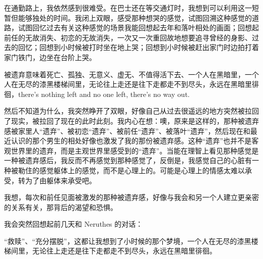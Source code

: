在通勤路上，我依然感到很难受。在巴士还在等交通灯时，我想到可以利用这一短暂但能够独处的时间。我闭上双眼，感受那种想哭的感觉，试图回溯这种感觉的道路，试图回忆过去有关这种感觉的场景\pozhehao{}我能回想起去年和落叶相处的画面；回想起前任的无故消失、初恋的无故消失，一次又一次重回故地想要追寻曾经的身影、过去的回忆；回想到小时候被打时坐在地上哭；回想到小时候被赶出家门时边拍打着家门铁门，边坐在台阶上哭。

被遗弃意味着死亡、孤独、无意义、虚无、不值得活下去、一个人在黑暗里，一个人在无尽的漆黑楼梯间里，无论往上走还是往下走都走不到尽头，永远在黑暗里徘徊，there's nothing left and no one left, there's no way out.

然后不知道为什么，我突然睁开了双眼，好像自己从过去很遥远的地方突然被拉回了现实，被拉回了现在的此时此刻。我内心在想：噢，原来是这样的，那种被遗弃感\pozhehao{}被家里人“遗弃”、被初恋“遗弃”、被前任“遗弃”、被落叶“遗弃”，然后现在和最近认识的那个男生的相处好像也激发了我的那份被遗弃感。这种“遗弃”也并不是客观世界里的遗弃，而是主观世界里感受到的“遗弃”。当能在理智上看见那种感觉是一种被遗弃感后，我反而不再感觉到那种感觉了，反倒是，我感觉自己的心脏有一种被勒住的感觉\pozhehao{}躯体上的感觉，而不是心理上的。可能是心理上的情感太难以承受，转为了由躯体来承受吧。

我想，每次和前任见面被激发的那种被遗弃感，好像与我会和另一个人建立更亲密的关系有关，那背后的渴望和恐惧。

我会突然回想起前几天和 Neruthes 的对话：


“救赎”、“充分摆脱”，这都让我想到了小时候的那个梦境，一个人在无尽的漆黑楼梯间里，无论往上走还是往下走都走不到尽头，永远在黑暗里徘徊。

